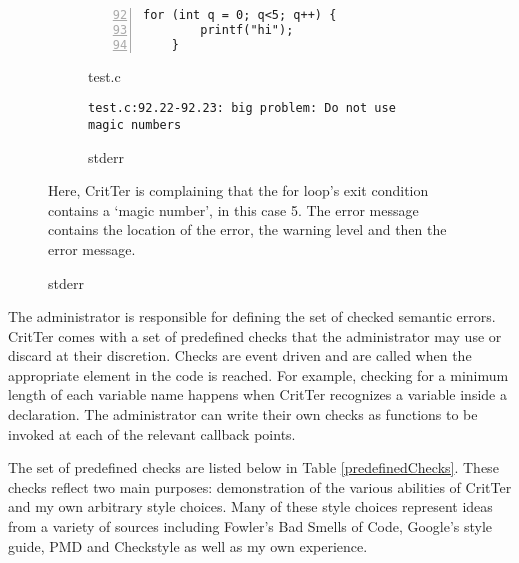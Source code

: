 \documentclass[12pt]{report}
\newcommand{\programName}{CritTer\xspace}
\begin{document}
\begin{figure}
\caption{Example Error and Corresponding Message}
\label{errorExample}
\begin{subfigure}[b]{.5\linewidth}
\caption{test.c}
\label{errorExampleCode}
\begin{lstlisting}[numbers=left, firstnumber=92,xleftmargin=1cm]
	for (int q = 0; q<5; q++) {
		printf("hi");
	}
\end{lstlisting}
\end{subfigure}
\begin{subfigure}[b]{.5\linewidth}
\caption{stderr}
\label{errorExampleStderr}
\begin{lstlisting}[xleftmargin=1cm]
test.c:92.22-92.23: big problem: Do not use magic numbers
\end{lstlisting}
\end{subfigure}
\small{Here, \programName is complaining that the for loop's exit condition contains a `magic number', in this case 5. The error message contains the location of the error, the warning level and then the error message.}
\end{figure}

The administrator is responsible for defining the set of checked semantic errors. \programName 
comes with a set of predefined checks that the administrator may use or discard at their discretion. 
Checks are event driven and are called when the appropriate element in the code is reached. For 
example, checking for a minimum length of each variable name happens when \programName 
recognizes a variable inside a declaration. The administrator can write their own checks as functions 
to be invoked at each of the relevant callback points.

The set of predefined checks are listed below in Table \ref{predefinedChecks}. These checks reflect 
two main purposes: demonstration of the various abilities of \programName and my own arbitrary style 
choices. Many of these style choices represent ideas from a variety of sources including Fowler's Bad 
Smells of Code\cite{refactoring}, Google's style guide\cite{googleStyle}, PMD\cite{pmd} and 
Checkstyle\cite{checkstyle} as well as my own experience.
\end{document}
